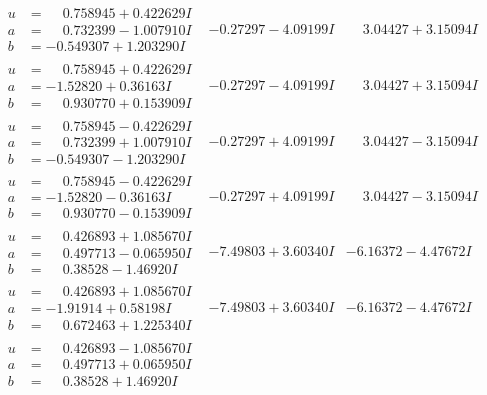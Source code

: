 \documentclass[1p]{elsarticle_modified}
\theoremstyle{definition}
\begin{document}
$$\begin{array}{c|c|c}
\begin{aligned}
u &= \phantom{-}0.758945 + 0.422629 I \\
a &= \phantom{-}0.732399 - 1.007910 I \\
b &= -0.549307 + 1.203290 I\end{aligned}
 & -0.27297 - 4.09199 I & \phantom{-}3.04427 + 3.15094 I \\ \hline\begin{aligned}
u &= \phantom{-}0.758945 + 0.422629 I \\
a &= -1.52820 + 0.36163 I \\
b &= \phantom{-}0.930770 + 0.153909 I\end{aligned}
 & -0.27297 - 4.09199 I & \phantom{-}3.04427 + 3.15094 I \\ \hline\begin{aligned}
u &= \phantom{-}0.758945 - 0.422629 I \\
a &= \phantom{-}0.732399 + 1.007910 I \\
b &= -0.549307 - 1.203290 I\end{aligned}
 & -0.27297 + 4.09199 I & \phantom{-}3.04427 - 3.15094 I \\ \hline\begin{aligned}
u &= \phantom{-}0.758945 - 0.422629 I \\
a &= -1.52820 - 0.36163 I \\
b &= \phantom{-}0.930770 - 0.153909 I\end{aligned}
 & -0.27297 + 4.09199 I & \phantom{-}3.04427 - 3.15094 I \\ \hline\begin{aligned}
u &= \phantom{-}0.426893 + 1.085670 I \\
a &= \phantom{-}0.497713 - 0.065950 I \\
b &= \phantom{-}0.38528 - 1.46920 I\end{aligned}
 & -7.49803 + 3.60340 I & -6.16372 - 4.47672 I \\ \hline\begin{aligned}
u &= \phantom{-}0.426893 + 1.085670 I \\
a &= -1.91914 + 0.58198 I \\
b &= \phantom{-}0.672463 + 1.225340 I\end{aligned}
 & -7.49803 + 3.60340 I & -6.16372 - 4.47672 I \\ \hline\begin{aligned}
u &= \phantom{-}0.426893 - 1.085670 I \\
a &= \phantom{-}0.497713 + 0.065950 I \\
b &= \phantom{-}0.38528 + 1.46920 I\end{aligned}

\end{array}$$
\end{document}
